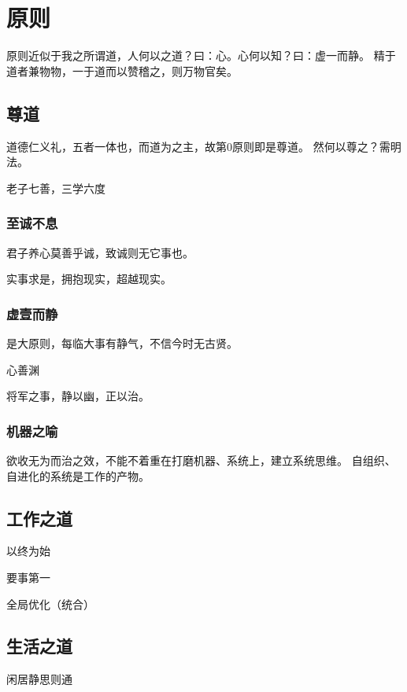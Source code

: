 \chapter{原则}

原则近似于我之所谓道，人何以之道？曰：心。心何以知？曰：虚一而静。
精于道者兼物物，一于道而以赞稽之，则万物官矣。

\section{尊道}

道德仁义礼，五者一体也，而道为之主，故第0原则即是尊道。
然何以尊之？需明法。

老子七善，三学六度

\subsection{至诚不息}

君子养心莫善乎诚，致诚则无它事也。

实事求是，拥抱现实，超越现实。

\subsection{虚壹而静}

是大原则，每临大事有静气，不信今时无古贤。

心善渊

将军之事，静以幽，正以治。

\subsection{机器之喻}

欲收无为而治之效，不能不着重在打磨机器、系统上，建立系统思维。
自组织、自进化的系统是工作的产物。

\section{工作之道}

以终为始

要事第一

全局优化（统合）

\section{生活之道}

闲居静思则通
